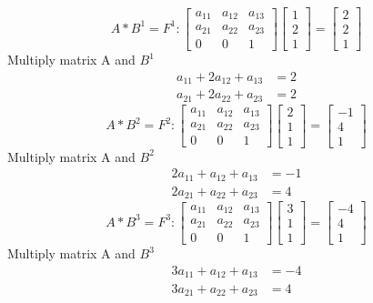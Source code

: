 \documentclass{article}
\begin{document}
\[
A*B^1=F^1 : 
\begin{bmatrix}
	a_{11}&a_{12}&a_{13}\\
	a_{21}&a_{22}&a_{23}\\
	0&0&1
\end{bmatrix}
\begin{bmatrix}
	1\\2\\1
\end{bmatrix}
=
\begin{bmatrix}
	2\\2\\1
\end{bmatrix}
\]
Multiply matrix A and $B^1$
\begin{align}
\label{a*b1x}a_{11}+2a_{12}+a_{13}&=2\\
\label{a*b1y}a_{21}+2a_{22}+a_{23}&=2
\end{align}
\[
A*B^2=F^2 : 
\begin{bmatrix}
	a_{11}&a_{12}&a_{13}\\
	a_{21}&a_{22}&a_{23}\\
	0&0&1
\end{bmatrix}
\begin{bmatrix}
	2\\1\\1
\end{bmatrix}
=
\begin{bmatrix}
	-1\\4\\1
\end{bmatrix}
\]
Multiply matrix A and $B^2$
\begin{align}
\label{a*b2x}2a_{11}+a_{12}+a_{13}&=-1\\
\label{a*b2y}2a_{21}+a_{22}+a_{23}&=4
\end{align}
\[
A*B^3=F^3 : 
\begin{bmatrix}
	a_{11}&a_{12}&a_{13}\\
	a_{21}&a_{22}&a_{23}\\
	0&0&1
\end{bmatrix}
\begin{bmatrix}
	3\\1\\1
\end{bmatrix}
=
\begin{bmatrix}
	-4\\4\\1
\end{bmatrix}
\]
Multiply matrix A and $B^3$
\begin{align}
\label{a*b3x}3a_{11}+a_{12}+a_{13}&=-4\\
\label{a*b3y}3a_{21}+a_{22}+a_{23}&=4
\end{align}
\end{document}
